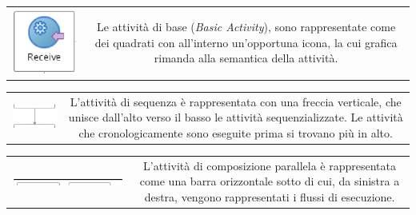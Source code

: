 \begin{tabular}{c c}
\hline
\parbox[c][3.2cm][c]{0.2 \textwidth}
{\includegraphics[scale=0.80]{blide/dia/BlideInv}} &
\parbox[c][3.2cm][c]{0.6 \textwidth}{Le attività di base (\emph{Basic
Activity}), sono rappresentate come dei quadrati con all'interno un'opportuna
icona, la cui grafica rimanda alla semantica della attività.}\\
\end{tabular}

\begin{tabular}{c c}
\hline
\parbox[c][3cm][c]{0.2 \textwidth}
{\includegraphics[scale=0.95]{blide/dia/BlideSec}} &
\parbox[c][3cm][c]{0.6 \textwidth}{L'attività di sequenza è rappresentata con
una freccia verticale, che unisce dall'alto verso il basso le attività
sequenzializzate. Le attività che cronologicamente sono eseguite prima si
trovano più in alto.}\\
\end{tabular}

\begin{tabular}{c c}
\hline
\parbox[c][2cm][c]{0.2 \textwidth}{
\includegraphics[scale=0.40]{blide/dia/BlideFlow}} 
&
\parbox[c][2cm][c]{0.6 \textwidth}{L'attività di composizione parallela è
rappresentata come una barra orizzontale sotto di cui, da sinistra a destra,
vengono rappresentati i flussi di esecuzione.}\\
\end{tabular}

